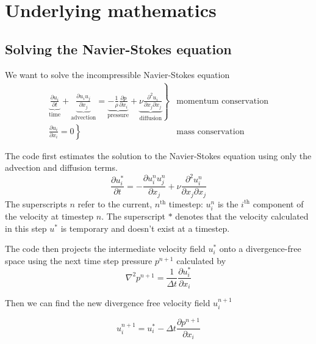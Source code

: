 \documentclass[12pt]{article}
\begin{document}
\section{Underlying mathematics}

\subsection{Solving the Navier-Stokes equation}
\label{mathBasics}

We want to solve the incompressible Navier-Stokes equation
\begin{align*}
  \left. \underbrace{\frac{\partial u_i}{\partial t}}_\textrm{time} +  \underbrace{\frac{\partial u_i u_j}{\partial x_j}}_\textrm{advection} = \underbrace{- \frac{1}{\rho}\frac{\partial p}{\partial x_i}}_\textrm{pressure} + \underbrace{\nu \frac{\partial^2 u_i}{\partial x_j \partial x_j}}_\textrm{diffusion} \right\} &\textrm{momentum conservation} \\
\left. \frac{\partial u_i}{\partial x_i} = 0 \right\} &\textrm{mass conservation}
\end{align*}

The code first estimates the solution to the Navier-Stokes equation using only the advection and diffusion terms. 
\begin{equation}
 \frac{\partial u_i^*}{\partial t} =   -\frac{\partial u_i^n u_j^n}{\partial x_j} + \nu \frac{\partial^2 u_i^n}{\partial x_j \partial x_j} 
 \label{predict}
\end{equation}
The superscripts $n$ refer to the current, $n^\textrm{th}$ timestep: $u_i^n$ is the $i^\textrm{th}$ component of the velocity at timestep $n$.  The superscript $*$ denotes that the velocity calculated in this step $u^*$ is temporary and doesn't exist at a timestep.

The code then projects the intermediate velocity field $u_i^*$ onto a divergence-free space using the next time step pressure $p^{n+1}$ calculated by
\begin{equation}
\nabla^2 p^{n+1} = \frac{1}{\Delta t}\frac{\partial u_i^*}{\partial x_i}
\label{poisson}
\end{equation}

Then we can find the new divergence free velocity field $u_i^{n+1}$ 

\begin{equation}
u_i^{n+1}= u_i^* - \Delta t\frac{\partial p^{n+1}}{\partial x_i}
\label{correct}
\end{equation}
\end{document}
